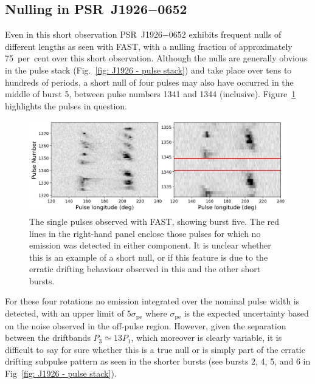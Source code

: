\subsection{Nulling in \texorpdfstring{PSR~J1926$-$0652}{PSR~J1926--0652}}
\label{sec: J1926 - analysis - nulling}
Even in this short observation PSR~J1926$-$0652 exhibits frequent nulls of different lengths as seen with FAST, with a nulling fraction of approximately 75~per~cent over this short observation. Although the nulls are generally obvious in the pulse stack (Fig.~\ref{fig: J1926 - pulse stack}) and take place over tens to hundreds of periods, a short null of four pulses may also have occurred in the middle of burst 5, between pulse numbers 1341 and 1344 (inclusive). Figure~\ref{fig: J1926 - burst five null} highlights the pulses in question.
\begin{figure}
    \begin{center}
        \includegraphics[width=1.0\textwidth]{Figures/J1926/burst_5}
        \caption[Burst 5 of PSR~J1926$-$0652 showing the possible null]{The single pulses observed with FAST, showing burst five. The red lines in the right-hand panel enclose those pulses for which no emission was detected in either component. It is unclear whether this is an example of a short null, or if this feature is due to the erratic drifting behaviour observed in this and the other short bursts.}
        \label{fig: J1926 - burst five null}
    \end{center}
\end{figure}
For these four rotations no emission integrated over the nominal pulse width is detected, with an upper limit of $5\sigma_\mathrm{pe}$ where $\sigma_\mathrm{pe}$ is the expected uncertainty based on the noise observed in the off-pulse region. 
However, given the separation between the driftbands $P_3 \simeq 13P_1$, which moreover is clearly variable, it is  difficult to say for sure whether this is a true null or is simply part of the erratic drifting subpulse pattern as seen in the shorter bursts (see bursts 2, 4, 5, and 6 in Fig~\ref{fig: J1926 - pulse stack}).


